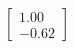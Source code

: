 \documentclass[preview]{standalone}
\begin{document}
\begin{align*}
\begin{bmatrix} 1.00 \\ -0.62 \end{bmatrix}
\end{align*}
\end{document}
